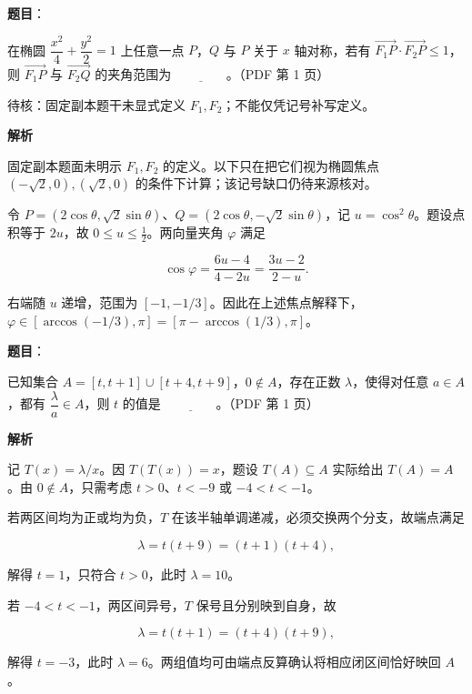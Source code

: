 \begin{answer}

\textbf{题目}：

在椭圆 $\dfrac{x^2}{4}+\dfrac{y^2}{2}=1$ 上任意一点 $P$，$Q$ 与 $P$ 关于 $x$ 轴对称，若有 $\overrightarrow{F_1P}\cdot\overrightarrow{F_2P}\leq1$，则 $\overrightarrow{F_1P}$ 与 $\overrightarrow{F_2Q}$ 的夹角范围为 $\underline{\qquad\qquad}$。（PDF 第 1 页）

\begin{gktip}
待核：固定副本题干未显式定义 $F_1,F_2$；不能仅凭记号补写定义。
\end{gktip}

\textbf{解析}

固定副本题面未明示 $F_1,F_2$ 的定义。以下只在把它们视为椭圆焦点 $(-\sqrt2,0),(\sqrt2,0)$ 的条件下计算；该记号缺口仍待来源核对。

令 $P=(2\cos\theta,\sqrt2\sin\theta)$、$Q=(2\cos\theta,-\sqrt2\sin\theta)$，记 $u=\cos^2\theta$。题设点积等于 $2u$，故 $0\le u\le\frac12$。两向量夹角 $\varphi$ 满足

\nopagebreak[4]
\[
\cos\varphi=\frac{6u-4}{4-2u}=\frac{3u-2}{2-u}.
\]

右端随 $u$ 递增，范围为 $[-1,-1/3]$。因此在上述焦点解释下，$\varphi\in[\arccos(-1/3),\pi]=[\pi-\arccos(1/3),\pi]$。


\end{answer}
\begin{answer}

\textbf{题目}：

已知集合 $A=[t,t+1]\cup[t+4,t+9]$，$0\notin A$，存在正数 $\lambda$，使得对任意 $a\in A$，都有 $\dfrac{\lambda}{a}\in A$，则 $t$ 的值是 $\underline{\qquad\qquad}$。（PDF 第 1 页）

\textbf{解析}

记 $T(x)=\lambda/x$。因 $T(T(x))=x$，题设 $T(A)\subseteq A$ 实际给出 $T(A)=A$。由 $0\notin A$，只需考虑 $t>0$、$t<-9$ 或 $-4<t<-1$。

若两区间均为正或均为负，$T$ 在该半轴单调递减，必须交换两个分支，故端点满足

\nopagebreak[4]
\[
\lambda=t(t+9)=(t+1)(t+4),
\]

解得 $t=1$，只符合 $t>0$，此时 $\lambda=10$。

若 $-4<t<-1$，两区间异号，$T$ 保号且分别映到自身，故

\nopagebreak[4]
\[
\lambda=t(t+1)=(t+4)(t+9),
\]

解得 $t=-3$，此时 $\lambda=6$。两组值均可由端点反算确认将相应闭区间恰好映回 $A$。


\end{answer}
